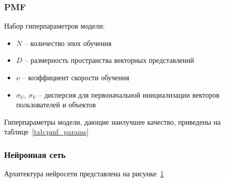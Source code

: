 \subsubsection{PMF}
Набор гиперпараметров модели:
\begin{itemize}
    \item $N$ -- количество эпох обучения
    \item $D$ -- размерность пространства векторных представлений
    \item $\nu$ -- коэффициент скорости обучения
    \item $\sigma_{U}$, $\sigma_{V}$ -- дисперсия для первоначальной инициализации векторов пользователей и объектов
\end{itemize}

Гиперпараметры модели, дающие наилучшее качество, приведены на таблице~\ref{tab:pmf_params}
\begin{table}[h]
    \caption{Гиперпараметры PMF}
    \label{tab:pmf_params}
\end{table}

\subsubsection{Нейронная сеть}
Архитектура нейросети представлена на рисунке~\ref{fig:nn_arch}
\begin{figure}[h!]
\caption{}
\label{fig:nn_arch}
\end{figure}

